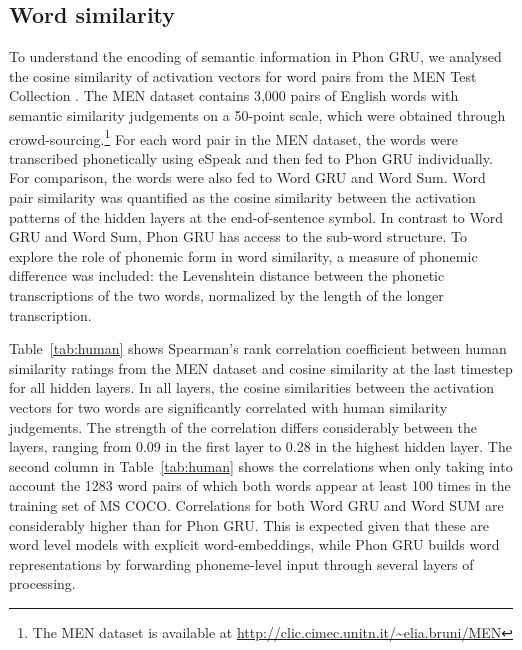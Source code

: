 \subsection{Word similarity}
To understand the encoding of semantic information in {\sc Phon GRU}, we analysed the cosine similarity of activation vectors for word pairs from the MEN Test Collection \cite{bruni2014multimodal}. The MEN dataset contains 3,000 pairs of English words with semantic similarity judgements on a 50-point scale, which were obtained through crowd-sourcing.\footnote{The MEN dataset is available at \url{http://clic.cimec.unitn.it/~elia.bruni/MEN}}
For each word pair in the MEN dataset, the words were transcribed phonetically using eSpeak and then fed to {\sc Phon GRU} individually. For comparison, the words were also fed to {\sc Word GRU} and {\sc Word Sum}. Word pair similarity was quantified as the cosine similarity between the activation patterns of the hidden layers at the end-of-sentence symbol.
In contrast to {\sc Word GRU} and {\sc Word Sum}, {\sc Phon GRU} has access to the sub-word structure. To explore the role of phonemic form in word similarity, a measure of phonemic difference was included: the Levenshtein distance between the phonetic transcriptions of the two words, normalized by the length of the longer transcription. 

Table~\ref{tab:human} shows Spearman's rank correlation coefficient between human similarity ratings from the MEN dataset and cosine similarity at the last timestep for all hidden layers. In all layers, the cosine similarities between the activation vectors for two words are significantly correlated with human similarity judgements. The strength of the correlation differs considerably between the layers, ranging from 0.09 in the first layer to 0.28 in the highest hidden layer. The second column in Table~\ref{tab:human} shows the correlations when only taking into account the 1283 word pairs of which both words appear at least 100 times in the training set of MS COCO. 
Correlations for both {\sc Word GRU} and {\sc Word SUM} are considerably higher than for {\sc Phon GRU}. This is expected given that these are word level models with explicit word-embeddings, while {\sc Phon GRU} builds word representations by forwarding phoneme-level input through several layers of processing.

